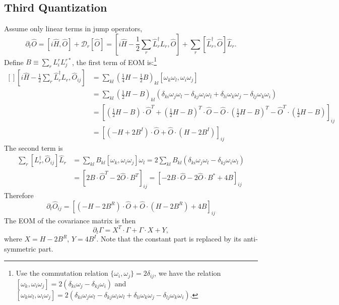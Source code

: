 \documentclass[aps,prx,superscriptaddress,nofootinbib]{revtex4}
\begin{document}
\subsection{Third Quantization}

Assume only linear terms in jump operators,
$$
	\partial_t \hat O = \left[i\hat H,\hat O\right] + \mathcal D_r[\hat O] 
	= \left[i\hat H - \frac{1}{2}\sum_r \hat L_r^\dagger L_r,\hat O\right] + \sum_r \left[\hat L_r^\dagger,\hat O\right]\hat L_r.
$$
Define $B\equiv \sum_r L_i^r L_j^{r*}$, the first term of EOM is:\footnote{Use the commutation relation $\{\omega_i, \omega_j\} = 2\delta_{ij}$, we have the relation $[\omega_k,\omega_i \omega_j] = 2(\delta_{ki}\omega_j-\delta_{kj}\omega_i)$ and $[\omega_k \omega_l, \omega_i \omega_j] = 2(\delta_{ki}\omega_j \omega_l-\delta_{kj} \omega_i \omega_l + \delta_{li}\omega_k \omega_j - \delta_{lj}\omega_k\omega_i)$.}
\begin{equation*}
\begin{aligned}[]
	\left[i\hat H - \frac{1}{2}\sum_r \hat L_r^\dagger L_r,\hat O_{ij}\right]
	&= \sum_{kl}\left(\frac{1}{4}H-\frac{1}{2}B \right)_{kl} [\omega_k \omega_l, \omega_i \omega_j] \\
	&= \sum_{kl} \left(\frac{1}{2}H- B\right)_{kl} (
		\delta_{ki}\omega_j \omega_l-\delta_{kj} \omega_i \omega_l + 
		\delta_{li}\omega_k \omega_j - \delta_{lj}\omega_k\omega_i
	) \\
	&= \left[
		\left(\frac{1}{2}H- B\right) \cdot \hat O^T + \left(\frac{1}{2}H- B\right)^T \cdot \hat O
		- \hat O \cdot \left(\frac{1}{2}H- B\right)^T- \hat O^T \cdot \left(\frac{1}{2}H- B\right)
	\right]_{ij} \\
	&= \left[
		(-H+2B^I) \cdot \hat O + \hat O \cdot (H-2B^I)
	\right]_{ij}
\end{aligned}
\end{equation*}
The second term is
\begin{equation*}
\begin{aligned}
	\sum_r \left[L_r^\dagger, \hat O_{ij}\right] \hat L_r
	&= \sum_{kl} B_{kl} [\omega_k, \omega_i \omega_j]\omega_l
	= 2\sum_{kl} B_{kl}\left(
		\delta_{ki} \omega_j \omega_l - 
		\delta_{kj} \omega_i \omega_l\right) \\
	&= \left[2B\cdot \hat O^T - 2\hat O\cdot B^T\right]_{ij}
	= \left[-2B\cdot \hat O - 2\hat O\cdot B^* + 4B\right]_{ij}
\end{aligned}
\end{equation*}
Therefore
$$
	\partial_t \hat O_{ij} = \left[
		(-H-2B^R) \cdot \hat O + 
		\hat O \cdot (H-2B^R) + 4B
	\right]_{ij}
$$
The EOM of the covariance matrix is then
\begin{equation}
	\partial_t \Gamma = X^T\cdot\Gamma + \Gamma \cdot X + Y,
\end{equation}
where $X = H - 2B^R$, $Y = 4B^I$. Note that the constant part is replaced by its anti-symmetric part.
\end{document}

